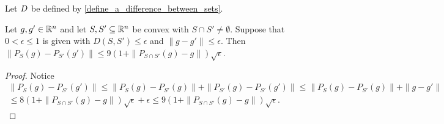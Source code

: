 \begin{corollary}
Let ${D}$ be defined by \cref{define_a_difference_between_sets}.

Let $g, g' \in \mathbb R^n$ and let $S, S' \subseteq \mathbb R^n$ be convex with $S \cap S' \ne \emptyset$.
Suppose that $0 < \epsilon \le 1$ is given with $D\left(S, S'\right) \le \epsilon$ and $\|g - g'\| \le \epsilon$.
Then $\|P_S(g) - P_{S'}(g')\| \le 9\left(1 + \|P_{S \cap S'}(g) - g\|\right) \sqrt{\epsilon}$.
\end{corollary}
\begin{proof}
Notice
\begin{align*}
\|P_S(g) - P_{S'}(g')\| 
\le \|P_S(g) - P_{S'}(g)\| + \|P_{S'}(g) - P_{S'}(g')\| 
\le \|P_S(g) - P_{S'}(g)\| + \|g - g'\| \\
\le 8\left(1 + \|P_{S \cap S'}(g) - g\|\right) \sqrt{\epsilon} + \epsilon
\le 9\left(1 + \|P_{S \cap S'}(g) - g\|\right) \sqrt{\epsilon}.
\end{align*}
\end{proof}

